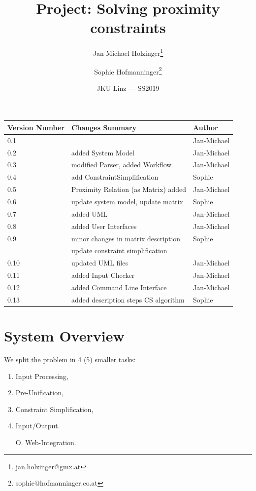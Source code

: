 \documentclass{article}
\title{Project: Solving proximity constraints} %
\author{Jan-Michael Holzinger\thanks{jan.holzinger@gmx.at} \and Sophie Hofmanninger\thanks{sophie@hofmanninger.co.at}} %
\date{JKU Linz --- SS2019} %
\begin{document}
\maketitle %


\begin{center}
\begin{tabular}[h]{|l|l|l|}
\hline
Version Number & Changes Summary & Author\\
\hline
0.1 & & Jan-Michael\\
\hline
0.2 & added System Model & Jan-Michael\\
\hline
0.3 & modified Parser, added Workflow & Jan-Michael\\
\hline
0.4 & add ConstraintSimplification & Sophie\\
\hline
0.5 & Proximity Relation (as Matrix) added & Jan-Michael\\
\hline
0.6 & update system model, update matrix & Sophie\\
\hline
0.7 & added UML & Jan-Michael\\
\hline
0.8 & added User Interfaces & Jan-Michael\\
\hline
0.9 & minor changes in matrix description & Sophie\\
& update constraint simplification&\\
\hline
0.10 & updated UML files & Jan-Michael\\
\hline
0.11 & added Input Checker & Jan-Michael\\
\hline
0.12 & added Command Line Interface & Jan-Michael\\
\hline
0.13 & added description steps CS algorithm & Sophie\\
\hline
\end{tabular}

\end{center}
\section{System Overview}

We split the problem in 4 (5) smaller tasks:
\begin{enumerate}
	\item Input Processing,
	\item Pre-Unification,
	\item Constraint Simplification,
	\item Input/Output.
	\item [O.] Web-Integration.
\end{enumerate}
\end{document}
